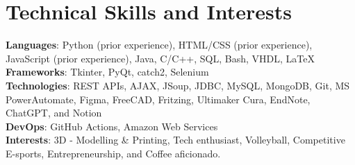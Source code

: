 \section{Technical Skills and Interests}
    \begin{itemize}[leftmargin=0.15in, label={}]
	\small{\item{
		\textbf{Languages}{: Python (prior experience), HTML/CSS (prior experience), JavaScript (prior experience), Java, C/C++, SQL, Bash, VHDL, LaTeX} \\
		\textbf{Frameworks}{: Tkinter, PyQt, catch2, Selenium} \\
		\textbf{Technologies}{: REST APIs, AJAX, JSoup, JDBC, MySQL, MongoDB, Git, MS PowerAutomate, Figma, FreeCAD, Fritzing, Ultimaker Cura, EndNote, ChatGPT, and Notion} \\
		\textbf{DevOps}{: GitHub Actions, Amazon Web Services} \\
        \textbf{Interests}{: 3D - Modelling \& Printing, Tech enthusiast, Volleyball, Competitive E-sports, Entrepreneurship, and Coffee aficionado.}
	}}
    \end{itemize}
